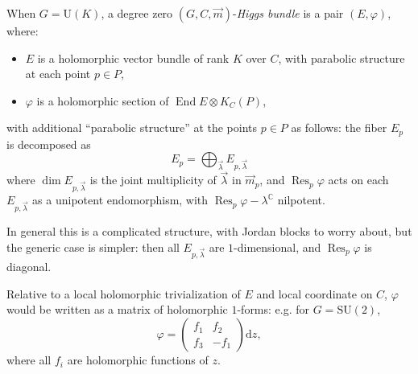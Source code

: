 \documentclass[12pt,letterpaper,reqno]{article}
\numberwithin{equation}{section}
\newcommand{\R}{\ensuremath{\mathbb R}}
\newcommand{\C}{\ensuremath{\mathbb C}}
\newcommand{\de}{\mathrm{d}}
\newcommand{\ti}[1]{\textit{#1}}
\DeclareMathOperator{\End}{End}
\DeclareMathOperator{\Res}{Res}
\newcommand{\SU}{\mathrm{SU}}
\newcommand{\U}{\mathrm{U}}
\begin{document}
\begin{defn}[Higgs bundles for $G = \U(K)$]
When $G = \U(K)$,
a degree zero $(G, C, \vec m)$-\ti{Higgs bundle} is a pair $(E, \varphi)$, where:
\begin{itemize}
  \item $E$ is a holomorphic vector bundle of rank $K$ over $C$, with parabolic structure at each point $p \in P$,
  \item $\varphi$ is a holomorphic section of $\End E \otimes K_C(P)$,
\end{itemize}
with additional ``parabolic structure'' at the points $p \in P$
as follows: the fiber $E_p$ is decomposed as
\begin{equation}
  E_p = \bigoplus_{\vec{\lambda}} E_{p,\vec{\lambda}}
\end{equation}
where $\dim E_{p,\vec\lambda}$ is the joint multiplicity
of $\vec\lambda$ in $\vec{m}_p$,
and $\Res_p \varphi$ acts on each $E_{p,\vec\lambda}$
as a unipotent endomorphism, with $\Res_p \varphi - \lambda^\C$
nilpotent.
\end{defn}

In general this is a complicated structure, with Jordan
blocks to worry about, but the generic case is simpler:
then all $E_{p,\vec\lambda}$ are $1$-dimensional,
and $\Res_p \varphi$ is diagonal.


Relative to a local holomorphic trivialization of $E$
and local coordinate on $C$, $\varphi$ would
be written as a matrix of holomorphic $1$-forms: e.g. for $G = \SU(2)$,
\begin{equation}
  \varphi = \begin{pmatrix} f_1 & f_2 \\ f_3 & -f_1 \end{pmatrix} \de z,
\end{equation}
where all $f_i$ are holomorphic functions of $z$. 
\end{document}
